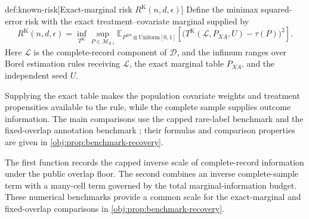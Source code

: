 \begin{definitionv}{def:known-risk}[Exact-marginal risk $R^{\mathrm K}(n,d,\epsilon)$]
Define the minimax squared-error risk with the exact treatment--covariate marginal supplied by
\[
R^{\mathrm K}(n,d,\epsilon)
=
\inf_{T^{\mathrm K}}\sup_{P\in\mathcal M_{d,\epsilon}}
\mathbb E_{P^{\otimes n}\otimes\mathrm{Uniform}[0,1]}
\left[
\bigl(T^{\mathrm K}(\mathcal L,P_{XA},U)-\tau(P)\bigr)^2
\right].
\]
Here \(\mathcal L\) is the complete-record component of \(\mathcal D\), and the infimum ranges over Borel estimation rules receiving \(\mathcal L\), the exact marginal table \(P_{XA}\), and the independent seed \(U\).
\end{definitionv}

Supplying the exact table makes the population covariate weights and treatment propensities available to the rule, while the complete sample supplies outcome information. The main comparisons use the capped rare-label benchmark  and the fixed-overlap annotation benchmark ; their formulas and comparison properties are given in \cref{obj:prop:benchmark-recovery}.



The first function records the capped inverse scale of complete-record information under the public overlap floor. The second combines an inverse complete-sample term with a many-cell term governed by the total marginal-information budget. These numerical benchmarks provide a common scale for the exact-marginal and fixed-overlap comparisons in \cref{obj:prop:benchmark-recovery}.
